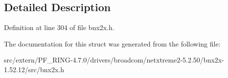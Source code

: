 \subsection{Detailed Description}


Definition at line 304 of file bnx2x.h.



The documentation for this struct was generated from the following file:\begin{DoxyCompactItemize}
\item 
src/extern/PF\_\-RING-\/4.7.0/drivers/broadcom/netxtreme2-\/5.2.50/bnx2x-\/1.52.12/src/bnx2x.h\end{DoxyCompactItemize}
